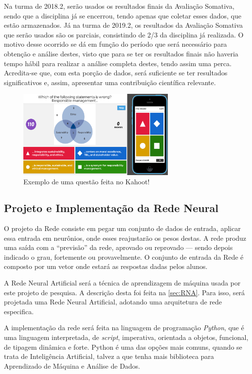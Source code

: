 \documentclass[
	12pt,				%
	openright,			%
	oneside,
	a4paper,			%
	english,			%
	french,				%
	spanish,			%
	brazil,				%
	]{abntex2}
\begin{document}
Na turma de 2018.2, serão usados os resultados finais da Avaliação Somativa, sendo que a disciplina já se encerrou, tendo apenas que coletar esses dados, que estão armazenados. Já na turma de 2019.2, os resultados da Avaliação Somativa que serão usados são os parciais, consistindo de 2/3 da disciplina já realizada. O motivo desse ocorrido se dá em função do período que será necessário para obtenção e análise destes, visto que para se ter os resultados finais não haveria tempo hábil para realizar a análise completa destes, tendo assim uma perca. Acredita-se que, com esta porção de dados, será suficiente se ter resultados significativos e, assim, apresentar uma contribuição científica relevante.

\begin{figure}
    \centering
    \includegraphics[width=0.7\textwidth]{Modelo_Projeto_Pesquisa_UFG_REJ_BCC/KahootScreenshot.png}
    \caption{Exemplo de uma questão feita no Kahoot!}
    \label{fig:kahoot}
\end{figure}
 
\subsection{Projeto e Implementação da Rede Neural}

O projeto da Rede consiste em pegar um conjunto de dados de entrada, aplicar essa entrada em neurônios, onde esses reajustarão os pesos destas. A rede produz uma saída com a ``previsão'' da rede, aprovado ou reprovado --- sendo depois indicado o grau, fortemente ou provavelmente. O conjunto de entrada da Rede é composto por um vetor onde estará as respostas dadas pelos alunos.

A Rede Neural Artificial será a técnica de aprendizagem de máquina usada por este projeto de pesquisa. A descrição desta foi feita na \autoref{sec:RNA}. Para isso, será projetada uma Rede Neural Artificial, adotando uma arquitetura de rede especifica.

A implementação da rede será feita na linguagem de programação \textit{Python}, que é uma linguagem interpretada, de \textit{script}, imperativa, orientada a objetos, funcional, de tipagem dinâmica e forte. Python é uma das opções mais comuns, quando se trata de Inteligência Artificial, talvez a que tenha mais biblioteca para Aprendizado de Máquina e Análise de Dados.
\end{document}
